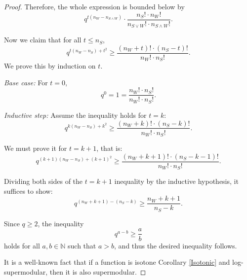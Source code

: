 \documentclass[10pt,a4paper]{amsart}
\begin{document}
\begin{proof}
		Therefore, the whole expression is bounded below by
		\[
		q^{t(n_W - n_{S \wedge W})} \cdot \frac{n_S! \cdot n_W!}{n_{S \vee W}! \cdot n_{S \wedge W}!}.
		\]
		
		Now we claim that for all \( t \leq n_S \),
		\[
		q^{t(n_W - n_S) + t^2} \geq \frac{(n_W + t)! \cdot (n_S - t)!}{n_W! \cdot n_S!}.
		\]
		We prove this by induction on \( t \).
		
		\emph{Base case:} For \( t = 0 \),
		\[
		q^0 = 1 = \frac{n_W! \cdot n_S!}{n_W! \cdot n_S!}.
		\]
		
		\emph{Inductive step:} Assume the inequality holds for \( t = k \):
		\[
		q^{k(n_W - n_S) + k^2} \geq \frac{(n_W + k)! \cdot (n_S - k)!}{n_W! \cdot n_S!}.
		\]
		
		We must prove it for \( t = k + 1 \), that is:
		\[
		q^{(k+1)(n_W - n_S) + (k+1)^2} \geq \frac{(n_W + k + 1)! \cdot (n_S - k - 1)!}{n_W! \cdot n_S!}.
		\]
		
		Dividing both sides of the \( t = k+1 \) inequality by the inductive hypothesis, it suffices to show:
		\[
		q^{(n_W + k + 1) - (n_S - k)} \geq \frac{n_W + k + 1}{n_S - k}.
		\]
		
		Since \( q \geq 2 \), the inequality
		\[
		q^{a-b} \geq \frac{a}{b}
		\]
		holds for all \( a,b \in \mathbb{N} \) such that $a>b$, and thus the desired inequality follows. 

        \item[(ii)] It is a well-known fact that if a function is isotone Corollary \ref{Isotonic} and log-supermodular, then it is also supermodular.
\end{proof}
\end{document}
